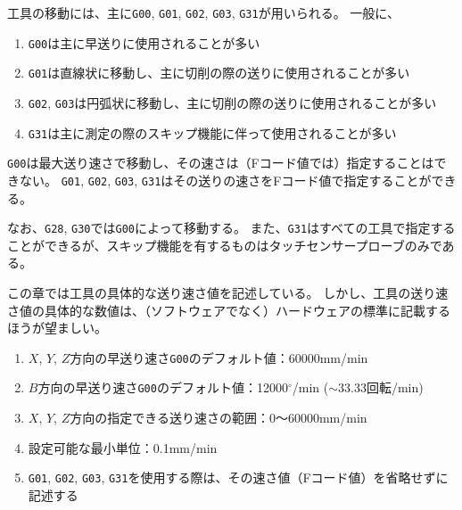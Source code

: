 


工具の移動には、主に\verb|G00|, \verb|G01|, \verb|G02|, \verb|G03|, \verb|G31|が用いられる。
一般に、
\begin{enumerate}
\item \verb|G00|は主に早送りに使用されることが多い
\item \verb|G01|は直線状に移動し、主に切削の際の送りに使用されることが多い
\item \verb|G02|, \verb|G03|は円弧状に移動し、主に切削の際の送りに使用されることが多い
\item \verb|G31|は主に測定の際のスキップ機能に伴って使用されることが多い
\end{enumerate}
\verb|G00|は最大送り速さで移動し、その速さは（Fコード値では）指定することはできない。
\verb|G01|, \verb|G02|, \verb|G03|, \verb|G31|はその送りの速さをFコード値で指定することができる。

なお、\verb|G28|, \verb|G30|では\verb|G00|によって移動する。
また、\verb|G31|はすべての工具で指定することができるが、スキップ機能を有するものはタッチセンサープローブのみである。
\begin{hosoku}
この章では工具の具体的な送り速さ値を記述している。
しかし、工具の送り速さ値の具体的な数値は、（ソフトウェアでなく）ハードウェアの標準に記載するほうが望ましい。
\end{hosoku}



\begin{enumerate}
\item $X$, $Y$, $Z$方向の早送り速さ\verb|G00|のデフォルト値：60000mm/min
\item $B$方向の早送り速さ\verb|G00|のデフォルト値：12000$^\circ$/min ($\sim 33.33$回転/min)
\item $X$, $Y$, $Z$方向の指定できる送り速さの範囲：0～60000mm/min
\item 設定可能な最小単位：0.1mm/min
\item \verb|G01|, \verb|G02|, \verb|G03|, \verb|G31|を使用する際は、その速さ値（Fコード値）を省略せずに記述する
\end{enumerate}



